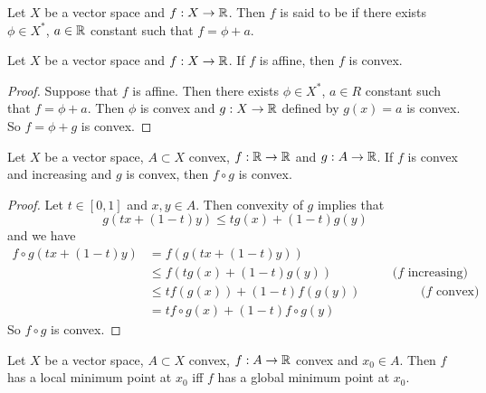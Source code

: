 \documentclass{book}
\begin{document}
	
	\begin{defn} 
	Let $X$ be a vector space and $f: X \rightarrow \mathbb{R}$. Then $f$ is said to be  if there exists $\phi \in X^*$, $a \in \mathbb{R}$ constant such that $f = \phi + a$.\\
	\end{defn}
	
	\begin{ex} 
	Let $X$ be a vector space and $f: X \rightarrow \mathbb{R}$. If $f$ is affine, then $f$ is convex.
	\end{ex}
	
	\begin{proof}
	Suppose that $f$ is affine. Then there exists $\phi \in X^*$, $a \in R$ constant such that $f = \phi + a$. Then $\phi$ is convex and $g: X \rightarrow \mathbb{R}$ defined by $g(x) = a$ is convex. So $f = \phi + g$ is convex.
	\end{proof}
	
	\begin{ex} 
	Let $X$ be a vector space, $A \subset X$ convex, $f:\mathbb{R} \rightarrow \mathbb{R}$ and $g: A \rightarrow \mathbb{R}$. If $f$ is convex and increasing and $g$ is convex, then $f \circ g$ is convex.
	\end{ex}	
	
	\begin{proof}
	Let $t \in [0,1]$ and $x, y \in A$. Then convexity of $g$ implies that $$g(tx +(1-t)y) \leq tg(x) + (1-t)g(y)$$ and we have
	\begin{align*}
	f\circ g(tx +(1-t)y) 
	&= f(g(tx +(1-t)y)) \\
	& \leq f(tg(x) + (1-t)g(y)) \hspace{2cm} (f \text{ increasing)}\\
	& \leq tf(g(x)) + (1-t)f(g(y)) \hspace{2cm}  (f \text{ convex)}\\	
	&= tf \circ g(x) + (1-t)f \circ g(y)
\end{align*}	 
So $f \circ g$ is convex.
	\end{proof}
	
	\begin{ex} 
	Let $X$ be a vector space, $A \subset X$ convex, $f:A \rightarrow \mathbb{R}$ convex and $x_0 \in A$. Then $f$ has a local minimum point at $x_0$ iff $f$ has a global minimum point at $x_0$.
	\end{ex}	
	
\end{document}
